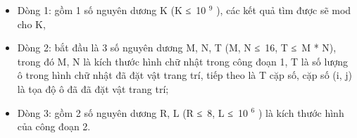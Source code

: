\begin{itemize}
	\item     Dòng 1: gồm 1 số nguyên dương K (K ≤ 10    $^     9    $    ), các kết quả tìm được sẽ mod cho K,   
	\item     Dòng 2: bắt đầu là 3 số nguyên dương M, N, T (M, N ≤ 16, T ≤ M * N), trong đó M, N là kích thước hình chữ nhật trong công đoạn 1, T là số lượng ô trong hình chữ nhật đã đặt vật trang trí, tiếp theo là T cặp số, cặp số (i, j) là tọa độ ô đã đã đặt vật trang trí;   
	\item     Dòng 3: gồm 2 số nguyên dương R, L (R ≤ 8, L ≤ 10    $^     6    $    ) là kích thước hình của công đoạn 2.   
\end{itemize}